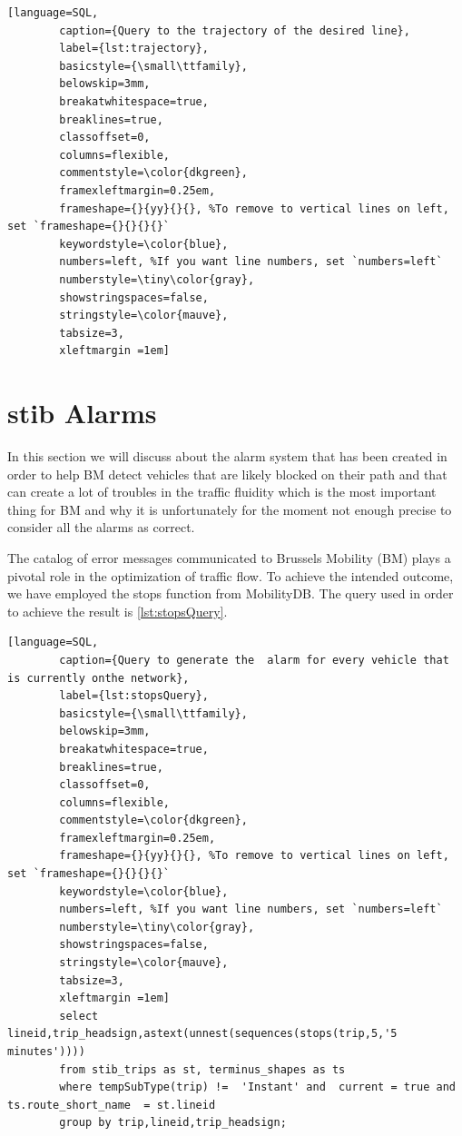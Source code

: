 \documentclass[12pt]{report}
\begin{document}
	\begin{lstlisting}[language=SQL,
		caption={Query to the trajectory of the desired line},
		label={lst:trajectory},
		basicstyle={\small\ttfamily},
		belowskip=3mm,
		breakatwhitespace=true,
		breaklines=true,
		classoffset=0,
		columns=flexible,
		commentstyle=\color{dkgreen},
		framexleftmargin=0.25em,
		frameshape={}{yy}{}{}, %To remove to vertical lines on left, set `frameshape={}{}{}{}`
		keywordstyle=\color{blue},
		numbers=left, %If you want line numbers, set `numbers=left`
		numberstyle=\tiny\color{gray},
		showstringspaces=false,
		stringstyle=\color{mauve},
		tabsize=3,
		xleftmargin =1em]
	\end{lstlisting}
	
	
	\section{\acrshort{stib} Alarms}
	
	In this section we will discuss about the alarm system that has been created in order to help BM detect vehicles that are likely blocked on their path and that can create a lot of troubles in the traffic fluidity which is the most important thing for BM and why it is unfortunately for the moment not enough precise to consider all the alarms as correct.
	
	The catalog of error messages communicated to Brussels Mobility (BM) plays a pivotal role in the optimization of traffic flow. To achieve the intended outcome, we have employed the stops function from MobilityDB. The query used in order to achieve the  result is \ref{lst:stopsQuery}. 
	
	\begin{lstlisting}[language=SQL,
		caption={Query to generate the  alarm for every vehicle that is currently onthe network},
		label={lst:stopsQuery},
		basicstyle={\small\ttfamily},
		belowskip=3mm,
		breakatwhitespace=true,
		breaklines=true,
		classoffset=0,
		columns=flexible,
		commentstyle=\color{dkgreen},
		framexleftmargin=0.25em,
		frameshape={}{yy}{}{}, %To remove to vertical lines on left, set `frameshape={}{}{}{}`
		keywordstyle=\color{blue},
		numbers=left, %If you want line numbers, set `numbers=left`
		numberstyle=\tiny\color{gray},
		showstringspaces=false,
		stringstyle=\color{mauve},
		tabsize=3,
		xleftmargin =1em]
		select  lineid,trip_headsign,astext(unnest(sequences(stops(trip,5,'5 minutes'))))
		from stib_trips as st, terminus_shapes as ts
		where tempSubType(trip) !=  'Instant' and  current = true and  ts.route_short_name  = st.lineid
		group by trip,lineid,trip_headsign;
	\end{lstlisting}
	
\end{document}
